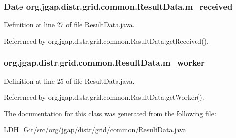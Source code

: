 \hypertarget{classorg_1_1jgap_1_1distr_1_1grid_1_1common_1_1_result_data_a61f93e2462d77580b70bc2f2303957c3}{
\subsubsection[{m\-\_\-received}]{\setlength{\rightskip}{0pt plus 5cm}Date org.\-jgap.\-distr.\-grid.\-common.\-Result\-Data.\-m\-\_\-received\hspace{0.3cm}{\ttfamily [private]}}}\label{classorg_1_1jgap_1_1distr_1_1grid_1_1common_1_1_result_data_a61f93e2462d77580b70bc2f2303957c3}


Definition at line 27 of file Result\-Data.\-java.



Referenced by org.\-jgap.\-distr.\-grid.\-common.\-Result\-Data.\-get\-Received().

\hypertarget{classorg_1_1jgap_1_1distr_1_1grid_1_1common_1_1_result_data_a69e9a3629a5b82f86a8e4266cd728493}{
\subsubsection[{m\-\_\-worker}]{ org.\-jgap.\-distr.\-grid.\-common.\-Result\-Data.\-m\-\_\-worker\hspace{0.3cm}{\ttfamily [private]}}}\label{classorg_1_1jgap_1_1distr_1_1grid_1_1common_1_1_result_data_a69e9a3629a5b82f86a8e4266cd728493}


Definition at line 25 of file Result\-Data.\-java.



Referenced by org.\-jgap.\-distr.\-grid.\-common.\-Result\-Data.\-get\-Worker().



The documentation for this class was generated from the following file\-:\begin{DoxyCompactItemize}
\item 
L\-D\-H\-\_\-\-Git/src/org/jgap/distr/grid/common/\hyperlink{_result_data_8java}{Result\-Data.\-java}\end{DoxyCompactItemize}
